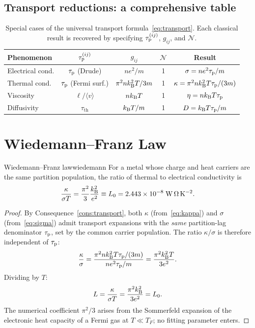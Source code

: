 \subsection{Transport reductions: a comprehensive table}

\begin{table}[!htbp]
\centering
\caption{Special cases of the universal transport formula~\eqref{eq:transport}.
Each classical result is recovered by specifying $\tau_{\mathrm{p}}^{(ij)}$, $g_{ij}$,
and $\mathcal{N}$.}
\label{tab:transport-cases}
\begin{tabular}{lcccc}
\toprule
Phenomenon &
  $\tau_{\mathrm{p}}^{(ij)}$ &
  $g_{ij}$ &
  $\mathcal{N}$ &
  Result \\
\midrule
Electrical cond.  & $\tau_{\mathrm{p}}$ (Drude)      & $ne^2/m$      & 1 & $\sigma = ne^2\tau_{\mathrm{p}}/m$ \\
Thermal cond.     & $\tau_{\mathrm{p}}$ (Fermi surf.)& $\pi^2nk_{\mathrm{B}}^2T/3m$ & 1 & $\kappa=\pi^2nk_{\mathrm{B}}^2T\tau_{\mathrm{p}}/(3m)$ \\
Viscosity         & $\ell/\langle v\rangle$ & $nk_{\mathrm{B}} T$  & 1 & $\eta = nk_{\mathrm{B}} T\tau_{\mathrm{p}}$ \\
Diffusivity       & $\tau_{\mathrm{th}}$ & $k_{\mathrm{B}} T/m$     & 1 & $D=k_{\mathrm{B}} T\tau_{\mathrm{p}}/m$ \\
\bottomrule
\end{tabular}
\end{table}

\section{Wiedemann--Franz Law}
\label{sec:wiedemann}

\begin{consequence}{Wiedemann--Franz law}{wiedemann}
For a metal whose charge and heat carriers are the same partition
population, the ratio of thermal to electrical conductivity is
\begin{equation}
  \frac{\kappa}{\sigma T}
  = \frac{\pi^2}{3}\frac{k_{\mathrm{B}}^2}{e^2}
  \equiv L_0
  = 2.443 \times 10^{-8}\;\mathrm{W\,\Omega\,K^{-2}}.
  \label{eq:wiedemann}
\end{equation}
\end{consequence}

\begin{proof}
By Consequence~\ref{cons:transport}, both $\kappa$ (from~\eqref{eq:kappa})
and $\sigma$ (from~\eqref{eq:sigma}) admit transport expansions with
the \emph{same} partition-lag denominator $\tau_{\mathrm{p}}$, set by the common
carrier population.  The ratio $\kappa/\sigma$ is therefore independent
of $\tau_{\mathrm{p}}$:
\[
  \frac{\kappa}{\sigma}
  = \frac{\pi^2 n k_{\mathrm{B}}^2 T \tau_{\mathrm{p}} / (3m)}{ne^2\tau_{\mathrm{p}}/m}
  = \frac{\pi^2 k_{\mathrm{B}}^2 T}{3 e^2}.
\]
Dividing by $T$:
\[
  L = \frac{\kappa}{\sigma T}
  = \frac{\pi^2 k_{\mathrm{B}}^2}{3 e^2}
  = L_0.
\]
The numerical coefficient $\pi^2/3$ arises from the Sommerfeld expansion
of the electronic heat capacity of a Fermi gas at $T \ll T_F$; no fitting
parameter enters.
\end{proof}


